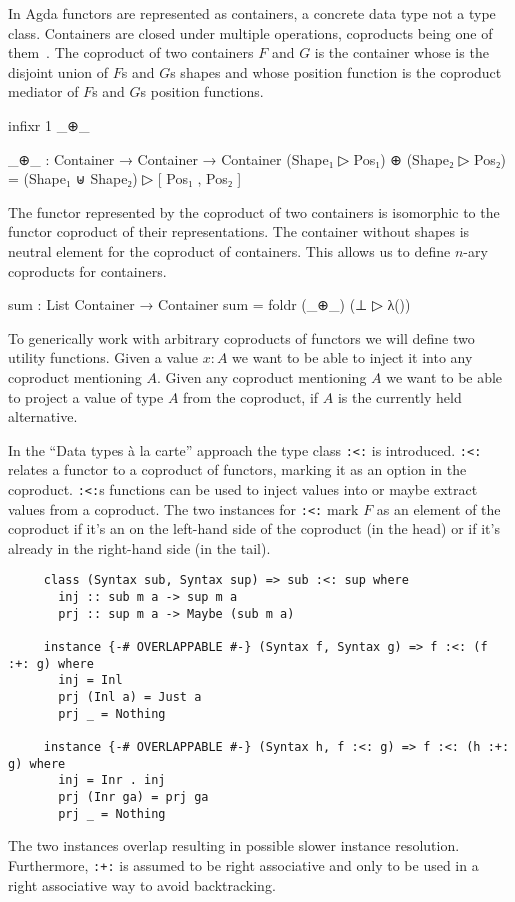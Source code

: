 In Agda functors are represented as containers, a concrete data type not a type
class.
Containers are closed under multiple operations, coproducts being one of
them~\cite{DBLP:conf/fossacs/AbbottAG03}.
The coproduct of two containers $F$ and $G$ is the container whose
 is the disjoint union of $F$s and $G$s shapes and whose
position function  is the coproduct mediator of $F$s and $G$s
position functions.

\begin{code}[hide]
infixr 1 _⊕_
\end{code}
\begin{code}
_⊕_ : Container → Container → Container
(Shape₁ ▷ Pos₁) ⊕ (Shape₂ ▷ Pos₂) = (Shape₁ ⊎ Shape₂) ▷ [ Pos₁ , Pos₂ ]
\end{code}
The functor represented by the coproduct of two containers is isomorphic to the
functor coproduct of their representations.
The container without shapes is neutral element for the coproduct of containers.
This allows us to define $n$-ary coproducts for containers.

\begin{code}
sum : List Container → Container
sum  = foldr (_⊕_) (⊥ ▷ λ())
\end{code}
To generically work with arbitrary coproducts of functors we will define two
utility functions.
Given a value $x:A$ we want to be able to inject it into any coproduct
mentioning $A$.
Given any coproduct mentioning $A$ we want to be able to project a value of
type $A$ from the coproduct, if $A$ is the currently held alternative.

In the ``Data types {\`{a}} la carte''\cite{DBLP:journals/jfp/Swierstra08}
approach the type class \texttt{:<:} is introduced.
\texttt{:<:} relates a functor to a coproduct of functors, marking it as an
option in the coproduct.
\texttt{:<:}s functions can be used to inject values into or maybe extract
values from a coproduct.
The two instances for \texttt{:<:} mark $F$ as an element of the coproduct if
it's an on the left-hand side of the coproduct (in the head) or if it's already
in the right-hand side (in the tail).

\begin{verbatim}
     class (Syntax sub, Syntax sup) => sub :<: sup where
       inj :: sub m a -> sup m a
       prj :: sup m a -> Maybe (sub m a)

     instance {-# OVERLAPPABLE #-} (Syntax f, Syntax g) => f :<: (f :+: g) where
       inj = Inl
       prj (Inl a) = Just a
       prj _ = Nothing

     instance {-# OVERLAPPABLE #-} (Syntax h, f :<: g) => f :<: (h :+: g) where
       inj = Inr . inj
       prj (Inr ga) = prj ga
       prj _ = Nothing
\end{verbatim}
The two instances overlap resulting in possible slower instance resolution.
Furthermore, \texttt{:+:} is assumed to be right associative and only to be
used in a right associative way to avoid backtracking.

